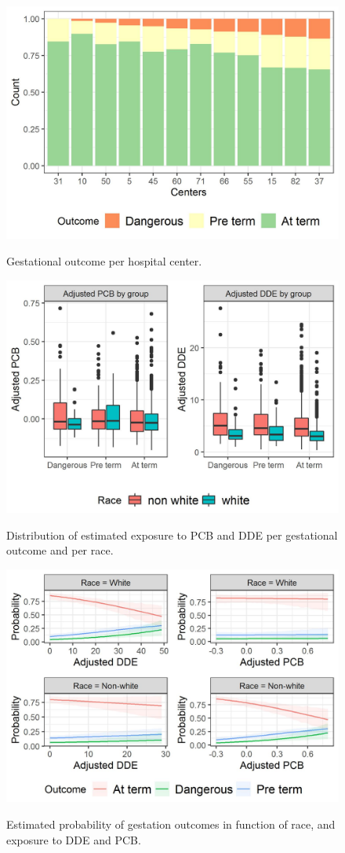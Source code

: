 \documentclass[10pt]{jmlr}%
\begin{document}
\begin{figure}[htbp]
	\centering
	\caption{Gestational outcome per hospital center.}
	\includegraphics[width=0.7\linewidth]{outcome_per_center}
	\label{fig:center}
\end{figure}

\begin{figure}[htbp]
	\centering
	\caption{Distribution of estimated exposure to PCB and DDE per gestational outcome and per race.}
	\includegraphics[width=0.7\linewidth]{pcb_dde_per_gest}
	\label{fig:pcb}
\end{figure}

\begin{figure}[htbp]
	\centering
	\caption{Estimated probability of gestation outcomes in function of race, and exposure to DDE and PCB.}
	\includegraphics[width=0.7\linewidth]{results}
	\label{fig:results}
\end{figure}
\end{document}
